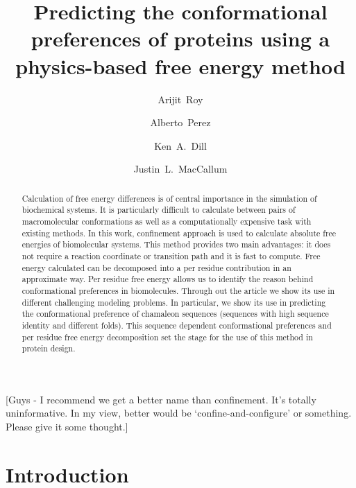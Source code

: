 \documentclass[12pt]{article}
\author{Arijit~Roy}
\author{Alberto~Perez}
\author{Ken~A.~Dill}
\author{Justin~L.~MacCallum}
\affil{Laufer Center for Physical and Quantitative Biology\\
    and Departments of Physics and Chemistry\\
    Stony Brook University\\
    Stony Brook, NY 11794-5252.}
\title{Predicting the conformational preferences of proteins using a physics-based free energy
method}
\newcommand{\Ken}[1]{\color{red}#1\normalcolor}
\begin{document}
\maketitle

\begin{abstract}

Calculation of free energy differences is of central importance in the simulation of biochemical
systems. It is particularly difficult to calculate between pairs of macromolecular conformations as
well as a computationally expensive task with existing methods. In this work, confinement approach
is used to calculate absolute free energies of biomolecular systems. This method provides two main
advantages: it does not require a reaction coordinate or transition path and it is fast to compute.
Free energy calculated can be decomposed into a per residue contribution in an approximate way. Per
residue free energy allows us to identify the reason behind conformational preferences in
biomolecules. Through out the article we show its use in different challenging modeling problems. In
particular, we show its use in predicting the conformational preference of chamaleon sequences
(sequences with high sequence identity and different folds). This sequence dependent conformational
preferences and per residue free energy decomposition set the stage for the use of this method in
protein design.

\end{abstract}

\Ken{[Guys - I recommend we get a better name than confinement.  It's totally uninformative.  In my view, better would be `confine-and-configure' or something.  
Please give it some thought.]}


\section{Introduction}
\end{document}
